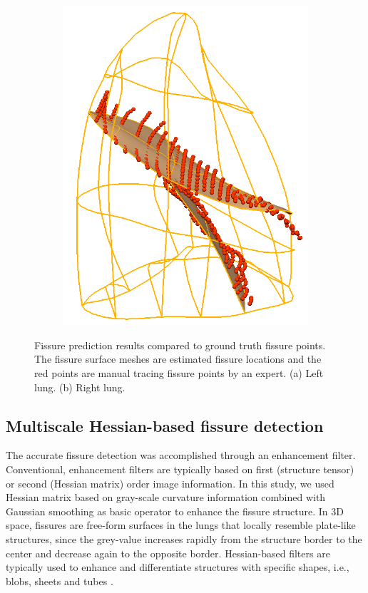 {\begin{figure}[htbp]
\begin{subfigure}{.37\linewidth}
  \includegraphics[width=\linewidth,trim={{.0\wd0} {.0\wd0} {.0\wd0} {.0\wd0}},clip]{Segmentation/Image/ProjectedRightFissureMesh.png}
  \caption{}
  \label{fig:PCAFissurePrediction-b} 
\end{subfigure}
\caption{Fissure prediction results compared to ground truth fissure points. The fissure surface meshes are estimated fissure locations and the red points are manual tracing fissure points by an expert. (a) Left lung. (b) Right lung.}
\label{fig:PCAFissurePrediction}
\end{figure}
\subsection{Multiscale Hessian-based fissure detection}

The accurate fissure detection was accomplished through an enhancement filter. Conventional, enhancement filters are typically based on first (structure tensor) or second (Hessian matrix) order image information. In this study, we used Hessian matrix based on gray-scale curvature information combined with Gaussian smoothing as basic operator to enhance the fissure structure. In 3D space, fissures are free-form surfaces in the lungs that locally resemble plate-like structures, since the grey-value increases rapidly from the structure border to the center and decrease again to the opposite border. Hessian-based filters are typically used to enhance and differentiate structures with specific shapes, i.e., blobs, sheets and tubes \citep{frangi1998multiscale,lorenz1997multi}.

}
